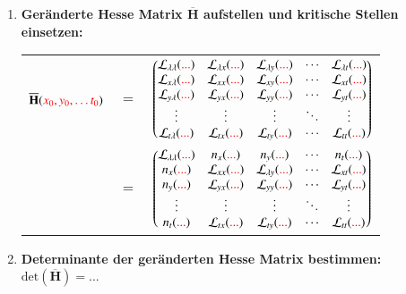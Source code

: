 \begin{enumerate}[itemsep=1ex]
    \item \textbf{Geränderte Hesse Matrix $\overline{\mathbf{H}}$ aufstellen und kritische Stellen einsetzen:}\\
    \begin{tabular}{lll}
        $\overline{\mathbf{H}}({\color{red}x_0,y_0,\ldots t_0})$ &$=$&
        $\left(
            \begin{matrix}
                {{\mathcal{L}_{\lambda\lambda}({\color{red}...})}}&{{\mathcal{L}_{\lambda x}({\color{red}...})}}&{{\mathcal{L}_{\lambda y}({\color{red}...})}}&{\cdots }&{{\mathcal{L}_{\lambda t}({\color{red}...})}}\\
                {{\mathcal{L}_{x\lambda}({\color{red}...})}}&{{\mathcal{L}_{xx}({\color{red}...})}}&{{\mathcal{L}_{xy}({\color{red}...})}}&{\cdots }&{{\mathcal{L}_{xt}({\color{red}...})}}\\
                {{\mathcal{L}_{y\lambda}({\color{red}...})}}&{{\mathcal{L}_{yx}({\color{red}...})}}&{{\mathcal{L}_{yy}({\color{red}...})}}&{\cdots }&{{\mathcal{L}_{yt}({\color{red}...})}}\\
                {\vdots }&{\vdots }&{\vdots }&{\ddots }&{\vdots }\\
                {{\mathcal{L}_{t\lambda}({\color{red}...})}}&{{\mathcal{L}_{tx}({\color{red}...})}}&{{\mathcal{L}_{ty}({\color{red}...})}}&{\cdots }&{{\mathcal{L}_{tt}({\color{red}...})}}\\
            \end{matrix}
        \right)$\\
        &$=$&
        $\left(
            \begin{matrix}
                {{\mathcal{L}_{\lambda\lambda}({\color{red}...})}}&{{n_{x}({\color{red}...})}}&{{n_{y}({\color{red}...})}}&{\cdots }&{{n_{t}({\color{red}...})}}\\
                {{n_{x}({\color{red}...})}}&{{\mathcal{L}_{xx}({\color{red}...})}}&{{\mathcal{L}_{\lambda y}({\color{red}...})}}&{\cdots }&{{\mathcal{L}_{xt}({\color{red}...})}}\\
                {{n_{y}({\color{red}...})}}&{{\mathcal{L}_{yx}({\color{red}...})}}&{{\mathcal{L}_{yy}({\color{red}...})}}&{\cdots }&{{\mathcal{L}_{yt}({\color{red}...})}}\\
                {\vdots }&{\vdots }&{\vdots }&{\ddots }&{\vdots }\\
                {{n_{t}({\color{red}...})}}&{{\mathcal{L}_{tx}({\color{red}...})}}&{{\mathcal{L}_{ty}({\color{red}...})}}&{\cdots }&{{\mathcal{L}_{tt}({\color{red}...})}}\\
            \end{matrix}
        \right)$
    \end{tabular}

    \item \textbf{Determinante der geränderten Hesse Matrix bestimmen:}\\
    $\text{det}\left(\overline{\mathbf{H}}\right) = ... $


\end{enumerate}
